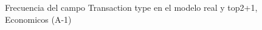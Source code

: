 \begin{figure}[H]
    \centering
    
    \caption{Frecuencia del campo Transaction type en el modelo real y top2+1, Economicos (A-1)}
    \label{frecuency-Transaction Type-top2+1}
\end{figure}
